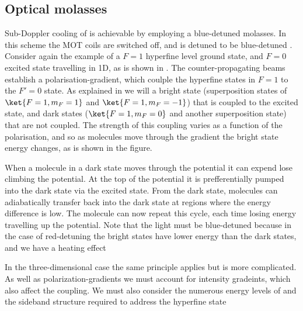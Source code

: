 \subsection*{Optical molasses}

Sub-Doppler cooling of \CaF{} is achievable by employing a blue-detuned
molasses. In this scheme the MOT coils are switched off, and  is
detuned to be blue-detuned . Consider again the example of a
$F=1$ hyperfine level ground state, and $F=0$ excited state travelling in 1D,
as is shown in .  The counter-propagating beams
establish a polarisation-gradient, which coulple the hyperfine states in $F=1$
to the $F'=0$ state. As explained in  we will a bright
state (superposition states of $\ket{F=1, m_F=1}$ and $\ket{F=1, m_F=-1}$) that
is coupled to the excited state, and dark states ($\ket{F=1, m_F=0}$ and
another superposition state) that are not coupled. The strength of this
coupling varies as a function of the polarisation, and so as molecules move
through the gradient the bright state energy changes, as is shown in the
figure.

\begin{figure}
  \centering
  \caption{}
  \label{overview:fig:molasses}
\end{figure}

When a molecule in a dark state moves through the potential it can expend
lose climbing the potential. At the top of the potential it is prefferentially
pumped into the dark state via the excited state. From the dark state,
molecules can adiabatically transfer back into the dark state at regions where
the energy difference is low. The molecule can now repeat this cycle, each time
losing energy travelling up the potential. Note that the light must be
blue-detuned because in the case of red-detuning the bright states have lower
energy than the dark states, and we have a heating effect 

In the three-dimensional case the same principle applies but is more
complicated. As well as polarization-gradients we must account for intensity
gradeints, which also affect the coupling. We must also consider the numerous
energy levels of \CaF{} and the sideband structure required to address the
hyperfine state 


